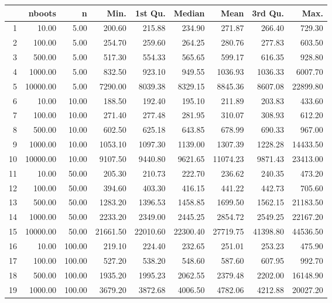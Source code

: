 \begin{table}[ht]
\centering
\begin{tabular}{rrrrrrrrr}
  \hline
 & nboots & n & Min. & 1st Qu. & Median & Mean & 3rd Qu. & Max. \\ 
  \hline
1 & 10.00 & 5.00 & 200.60 & 215.88 & 234.90 & 271.87 & 266.40 & 729.30 \\ 
  2 & 100.00 & 5.00 & 254.70 & 259.60 & 264.25 & 280.76 & 277.83 & 603.50 \\ 
  3 & 500.00 & 5.00 & 517.30 & 554.33 & 565.65 & 599.17 & 616.35 & 928.80 \\ 
  4 & 1000.00 & 5.00 & 832.50 & 923.10 & 949.55 & 1036.93 & 1036.33 & 6007.70 \\ 
  5 & 10000.00 & 5.00 & 7290.00 & 8039.38 & 8329.15 & 8845.36 & 8607.08 & 22899.80 \\ 
  6 & 10.00 & 10.00 & 188.50 & 192.40 & 195.10 & 211.89 & 203.83 & 433.60 \\ 
  7 & 100.00 & 10.00 & 271.40 & 277.48 & 281.95 & 310.07 & 308.93 & 612.20 \\ 
  8 & 500.00 & 10.00 & 602.50 & 625.18 & 643.85 & 678.99 & 690.33 & 967.00 \\ 
  9 & 1000.00 & 10.00 & 1053.10 & 1097.30 & 1139.00 & 1307.39 & 1228.28 & 14433.50 \\ 
  10 & 10000.00 & 10.00 & 9107.50 & 9440.80 & 9621.65 & 11074.23 & 9871.43 & 23413.00 \\ 
  11 & 10.00 & 50.00 & 205.30 & 210.73 & 222.70 & 236.62 & 240.35 & 473.20 \\ 
  12 & 100.00 & 50.00 & 394.60 & 403.30 & 416.15 & 441.22 & 442.73 & 705.60 \\ 
  13 & 500.00 & 50.00 & 1283.20 & 1396.53 & 1458.85 & 1699.50 & 1562.15 & 21183.50 \\ 
  14 & 1000.00 & 50.00 & 2233.20 & 2349.00 & 2445.25 & 2854.72 & 2549.25 & 22167.20 \\ 
  15 & 10000.00 & 50.00 & 21661.50 & 22010.60 & 22300.40 & 27719.75 & 41398.80 & 44536.50 \\ 
  16 & 10.00 & 100.00 & 219.10 & 224.40 & 232.65 & 251.01 & 253.23 & 475.90 \\ 
  17 & 100.00 & 100.00 & 527.20 & 538.20 & 548.60 & 587.60 & 607.95 & 992.70 \\ 
  18 & 500.00 & 100.00 & 1935.20 & 1995.23 & 2062.55 & 2379.48 & 2202.00 & 16148.90 \\ 
  19 & 1000.00 & 100.00 & 3679.20 & 3872.68 & 4006.50 & 4782.06 & 4212.88 & 20027.20 \\ 

\end{tabular}
\end{table}
